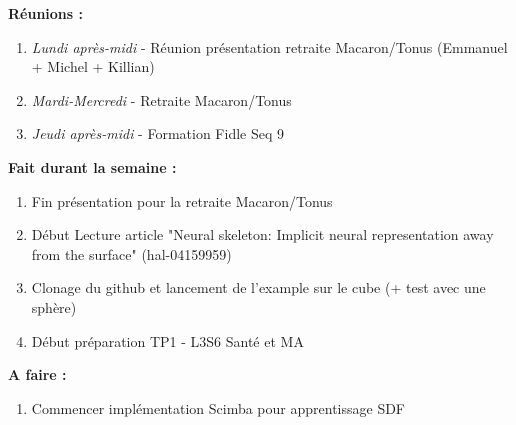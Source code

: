 \textbf{Réunions :}
\begin{enumerate}[label=\textbullet]
	\item \textit{Lundi après-midi} - Réunion présentation retraite Macaron/Tonus (Emmanuel + Michel + Killian)
	\item \textit{Mardi-Mercredi} - Retraite Macaron/Tonus
	\item \textit{Jeudi après-midi} - Formation Fidle Seq 9
\end{enumerate}
\textbf{Fait durant la semaine :}
\begin{enumerate}[label=\textbullet]
	\item Fin présentation pour la retraite Macaron/Tonus
	\item Début Lecture article "Neural skeleton: Implicit neural representation away from the surface" (hal-04159959)
	\item Clonage du github et lancement de l'example sur le cube (+ test avec une sphère)
	\item Début préparation TP1 - L3S6 Santé et MA
\end{enumerate}
\textbf{A faire :}
\begin{enumerate}[label=\textbullet]
	\item Commencer implémentation Scimba pour apprentissage SDF
\end{enumerate}